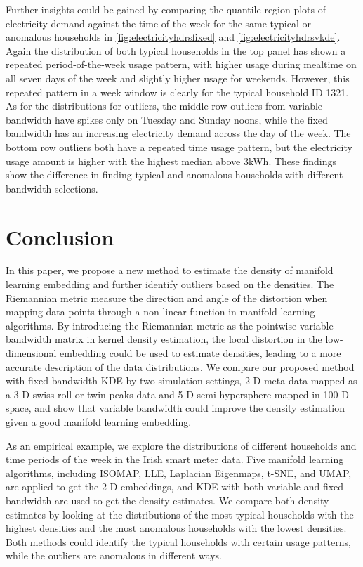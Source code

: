 \documentclass[11pt,a4paper,]{article}
\begin{document}
Further insights could be gained by comparing the quantile region plots of electricity demand against the time of the week for the same typical or anomalous households in \autoref{fig:electricityhdrsfixed} and \autoref{fig:electricityhdrsvkde}. Again the distribution of both typical households in the top panel has shown a repeated period-of-the-week usage pattern, with higher usage during mealtime on all seven days of the week and slightly higher usage for weekends.
However, this repeated pattern in a week window is clearly for the typical household ID 1321. As for the distributions for outliers, the middle row outliers from variable bandwidth have spikes only on Tuesday and Sunday noons, while the fixed bandwidth has an increasing electricity demand across the day of the week. The bottom row outliers both have a repeated time usage pattern, but the electricity usage amount is higher with the highest median above 3kWh. These findings show the difference in finding typical and anomalous households with different bandwidth selections.

\hypertarget{conclusion}{%
\section{Conclusion}\label{conclusion}}

In this paper, we propose a new method to estimate the density of manifold learning embedding and further identify outliers based on the densities. The Riemannian metric measure the direction and angle of the distortion when mapping data points through a non-linear function in manifold learning algorithms. By introducing the Riemannian metric as the pointwise variable bandwidth matrix in kernel density estimation, the local distortion in the low-dimensional embedding could be used to estimate densities, leading to a more accurate description of the data distributions. We compare our proposed method with fixed bandwidth KDE by two simulation settings, 2-D meta data mapped as a 3-D swiss roll or twin peaks data and 5-D semi-hypersphere mapped in 100-D space, and show that variable bandwidth could improve the density estimation given a good manifold learning embedding.

As an empirical example, we explore the distributions of different households and time periods of the week in the Irish smart meter data. Five manifold learning algorithms, including ISOMAP, LLE, Laplacian Eigenmaps, t-SNE, and UMAP, are applied to get the 2-D embeddings, and KDE with both variable and fixed bandwidth are used to get the density estimates. We compare both density estimates by looking at the distributions of the most typical households with the highest densities and the most anomalous households with the lowest densities. Both methods could identify the typical households with certain usage patterns, while the outliers are anomalous in different ways.
\end{document}
